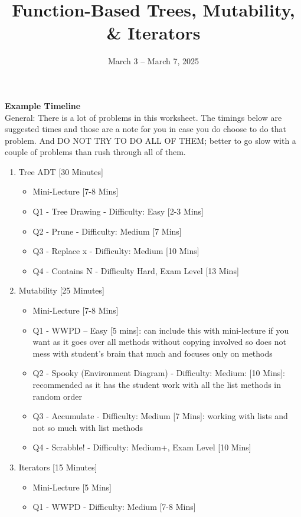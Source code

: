 \documentclass{exam}
\title{Function-Based Trees, Mutability, \& Iterators}
\date{March 3 -- March 7, 2025}
\begin{document}
\maketitle

\begin{meta}
    \textbf{Example Timeline}\\
    General: There is a lot of problems in this worksheet. The timings below are suggested times and those are a note for you in case you do choose to do that problem. And DO NOT TRY TO DO ALL OF THEM; better to go slow with a couple of problems than rush through all of them.
    \begin{enumerate}
        \item Tree ADT [30 Minutes] {\begin{itemize} 
        \item Mini-Lecture [7-8 Mins]
        \item Q1 - Tree Drawing - Difficulty: Easy [2-3 Mins]
        \item Q2 - Prune - Difficulty: Medium [7 Mins]
        \item Q3 - Replace x - Difficulty: Medium [10 Mins]
        \item Q4 - Contains N - Difficulty Hard, Exam Level [13 Mins]
        \end{itemize}}
        \item Mutability [25 Minutes] {\begin{itemize} 
            \item Mini-Lecture [7-8 Mins]
            \item Q1 - WWPD -- Easy [5 mins]: can include this with mini-lecture if you want as it goes over all methods without copying involved so does not mess with student's brain that much and focuses only on methods
            \item Q2 - Spooky (Environment Diagram) - Difficulty: Medium: [10 Mins]: recommended as it has the student work with all the list methods in random order
            \item Q3 - Accumulate - Difficulty: Medium [7 Mins]: working with lists and not so much with list methods
            \item Q4 - Scrabble! - Difficulty: Medium+, Exam Level [10 Mins]
        \end{itemize}}
        \item Iterators [15 Minutes] {\begin{itemize} 
            \item Mini-Lecture [5 Mins]
            \item Q1 - WWPD - Difficulty: Medium [7-8 Mins]
        \end{itemize}}
    \end{enumerate}
\end{meta}
\end{document}
